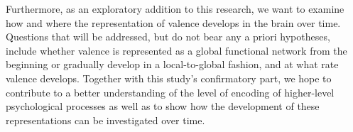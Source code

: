 \documentclass[jou,12pt,a4paper]{apa6}\usepackage[]{graphicx}\usepackage[]{color}
\begin{document}
Furthermore, as an exploratory addition to this research, we want to examine how and where the representation of valence develops in the brain over time. Questions that will be addressed, but do not bear any a priori hypotheses, include whether valence is represented as a global functional network from the beginning or gradually develop in a local-to-global fashion, and at what rate valence develops. Together with this study's confirmatory part, we hope to contribute to a better understanding of the level of encoding of higher-level psychological processes as well as to show how the development of these representations can be investigated over time.\\



\end{document}
